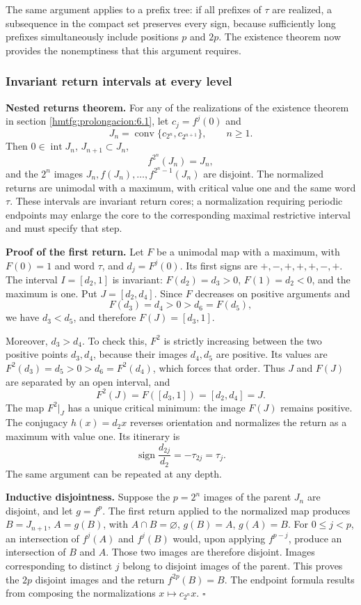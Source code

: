 The same argument applies to a prefix tree: if all prefixes of \(\tau\) are realized, a subsequence in the compact set preserves every sign, because sufficiently long prefixes simultaneously include positions \(p\) and \(2p\). The existence theorem now provides the nonemptiness that this argument requires.

\subsubsection{Invariant return intervals at every level}
\label{hmtfg:prolongacion:6.3}

\textbf{Nested returns theorem.} For any of the realizations of the existence theorem in section \ref{hmtfg:prolongacion:6.1}, let \(c_j=f^j(0)\) and
\[
J_n=\operatorname{conv}\{c_{2^n},c_{2^{n+1}}\},\qquad n\ge1.
\]
Then \(0\in\operatorname{int}J_n\), \(J_{n+1}\subset J_n\),
\[
f^{2^n}(J_n)=J_n,
\]
and the \(2^n\) images \(J_n,f(J_n),\ldots,f^{2^n-1}(J_n)\) are disjoint. The normalized returns are unimodal with a maximum, with critical value one and the same word \(\tau\). These intervals are invariant return cores; a normalization requiring periodic endpoints may enlarge the core to the corresponding maximal restrictive interval and must specify that step.

\textbf{Proof of the first return.} Let \(F\) be a unimodal map with a maximum, with \(F(0)=1\) and word \(\tau\), and \(d_j=F^j(0)\). Its first signs are \(+,-,+,+,+,-,+\). The interval \(I=[d_2,1]\) is invariant: \(F(d_2)=d_3>0\), \(F(1)=d_2<0\), and the maximum is one. Put \(J=[d_2,d_4]\). Since \(F\) decreases on positive arguments and
\[
F(d_3)=d_4>0> d_6=F(d_5),
\]
we have \(d_3<d_5\), and therefore \(F(J)=[d_3,1]\).

Moreover, \(d_3>d_4\). To check this, \(F^2\) is strictly increasing between the two positive points \(d_3,d_4\), because their images \(d_4,d_5\) are positive. Its values are \(F^2(d_3)=d_5>0>d_6=F^2(d_4)\), which forces that order. Thus \(J\) and \(F(J)\) are separated by an open interval, and
\[
F^2(J)=F([d_3,1])=[d_2,d_4]=J.
\]
The map \(F^2|_J\) has a unique critical minimum: the image \(F(J)\) remains positive. The conjugacy \(h(x)=d_2x\) reverses orientation and normalizes the return as a maximum with value one. Its itinerary is
\[
\operatorname{sign}\frac{d_{2j}}{d_2}
=-\tau_{2j}=\tau_j.
\]
The same argument can be repeated at any depth.

\textbf{Inductive disjointness.} Suppose the \(p=2^n\) images of the parent \(J_n\) are disjoint, and let \(g=f^p\). The first return applied to the normalized map produces \(B=J_{n+1}\), \(A=g(B)\), with \(A\cap B=\varnothing\), \(g(B)=A\), \(g(A)=B\). For \(0\le j<p\), an intersection of \(f^j(A)\) and \(f^j(B)\) would, upon applying \(f^{p-j}\), produce an intersection of \(B\) and \(A\). Those two images are therefore disjoint. Images corresponding to distinct \(j\) belong to disjoint images of the parent. This proves the \(2p\) disjoint images and the return \(f^{2p}(B)=B\). The endpoint formula results from composing the normalizations \(x\mapsto c_{2^n}x\). \(\square\)

